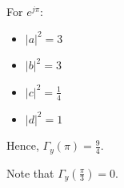 For $e^{j\pi}$:
\begin{itemize}
    \item $\left\lvert a \right\rvert^2=3$
    \item $\left\lvert b \right\rvert^2=3$
    \item $\left\lvert c \right\rvert^2=\frac{1}{4}$
    \item $\left\lvert d \right\rvert^2=1$
\end{itemize}
Hence, $\Gamma_y\left(\pi\right)=\frac{9}{4}$.

Note that $\Gamma_y\left(\frac{\pi}{3}\right)=0$.